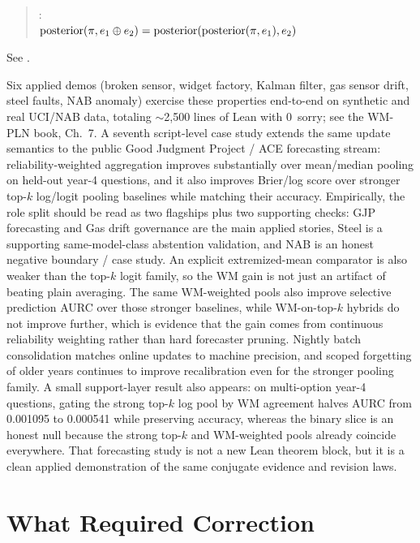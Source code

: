 \documentclass[11pt,openany]{report}
\begin{document}
\begin{quote}
: \\
$\text{posterior}(\pi, e_1 \oplus e_2)
  = \text{posterior}(\text{posterior}(\pi, e_1), e_2)$
\end{quote}

See .

Six applied demos (broken sensor, widget factory, Kalman filter, gas
sensor drift, steel faults, NAB anomaly) exercise these properties
end-to-end on synthetic and real UCI/NAB data, totaling $\sim$2{,}500
lines of Lean with 0~sorry; see the WM-PLN book, Ch.~7.  A seventh
script-level case study extends the same update semantics to the public
Good Judgment Project / ACE forecasting stream: reliability-weighted
aggregation improves substantially over mean/median pooling on held-out
year-4 questions, and it also improves Brier/log score over stronger
top-$k$ log/logit pooling baselines while matching their accuracy.
Empirically, the role split should be read as two flagships plus two
supporting checks: GJP forecasting and Gas drift governance are the main
applied stories, Steel is a supporting same-model-class abstention
validation, and NAB is an honest negative boundary / case study.
An explicit extremized-mean comparator is also weaker than the
top-$k$ logit family, so the WM gain is not just an artifact of beating
plain averaging.
The same WM-weighted pools also improve selective prediction AURC over
those stronger baselines, while WM-on-top-$k$ hybrids do not improve
further, which is evidence that the gain comes from continuous
reliability weighting rather than hard forecaster pruning.  Nightly
batch consolidation matches online updates to machine precision, and
scoped forgetting of older years continues to improve recalibration even
for the stronger pooling family.  A small support-layer result also
appears: on multi-option year-4 questions, gating the strong top-$k$
log pool by WM agreement halves AURC from 0.001095 to 0.000541 while
preserving accuracy, whereas the binary slice is an honest null because
the strong top-$k$ and WM-weighted pools already coincide everywhere.
That forecasting study is not a new
Lean theorem block, but it is a clean applied demonstration of the same
conjugate evidence and revision laws.

\section{What Required Correction}
\end{document}
